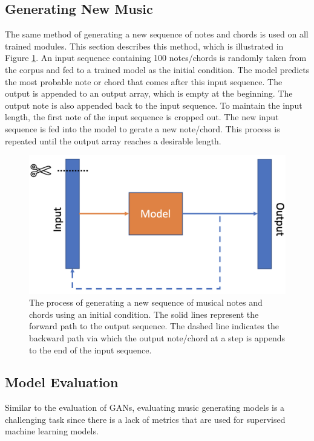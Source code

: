 \documentclass[sigconf,authorversion]{acmart}
\begin{document}
\subsection{Generating New Music}

The same method of generating a new sequence of notes and chords is used on all trained
modules. This section describes this method, which is illustrated in Figure \ref{generate_music}. 
An input sequence containing 100 notes/chords is randomly taken from the corpus and
fed to a trained model as the initial condition. The model predicts the most probable note
or chord that comes after this input sequence. The output is appended to an output array, which is
empty at the beginning. The output note is also appended back to the input sequence. To maintain 
the input length, the first note of the input sequence is cropped out. The new input sequence
is fed into the model to gerate a new note/chord. This process is repeated until the output
array reaches a desirable length.

\begin{figure}[h]
  \centering
  \includegraphics[width=\linewidth]{generate_music.png}
  \caption{The process of generating a new sequence of musical notes and chords 
  using an initial condition. The solid lines represent the forward path to the output
  sequence. The dashed line indicates the backward path via which the output note/chord at
  a step is appends to the end of the input sequence.}
  \label{generate_music}
\end{figure}

\subsection{Model Evaluation}

Similar to the evaluation of GANs, evaluating music generating models is a challenging 
task since there is a lack of metrics that are used for supervised machine learning models.
\end{document}

